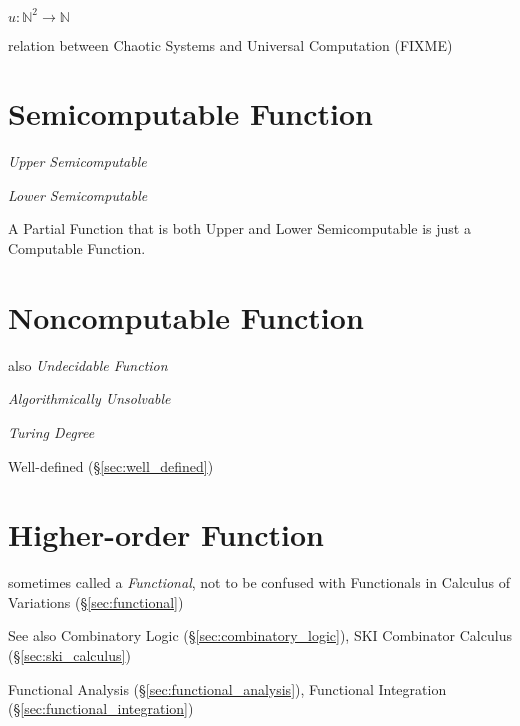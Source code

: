 $u : \mathbb{N}^2 \rightarrow \mathbb{N}$

relation between Chaotic Systems and Universal Computation (FIXME)



\section{Semicomputable Function}\label{sec:semicomputable_function}

\emph{Upper Semicomputable}

\emph{Lower Semicomputable}

A Partial Function that is both Upper and Lower Semicomputable is just
a Computable Function.



\section{Noncomputable Function}\label{sec:noncomputable_function}

also \emph{Undecidable Function}

\emph{Algorithmically Unsolvable}

\emph{Turing Degree}

Well-defined (\S\ref{sec:well_defined})



\section{Higher-order Function}\label{sec:higherorder_function}

sometimes called a \emph{Functional}, not to be confused with Functionals in
Calculus of Variations (\S\ref{sec:functional})

\fist See also Combinatory Logic (\S\ref{sec:combinatory_logic}), SKI
Combinator Calculus (\S\ref{sec:ski_calculus})

\fist Functional Analysis (\S\ref{sec:functional_analysis}), Functional
Integration (\S\ref{sec:functional_integration})



